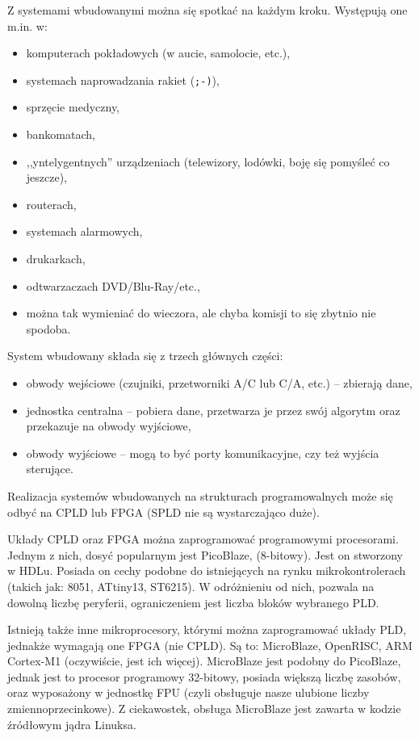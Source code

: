 Z systemami wbudowanymi można się spotkać na każdym kroku. Występują one m.in. w:
\begin{itemize}
\item komputerach pokładowych (w aucie, samolocie, etc.), 
\item systemach naprowadzania rakiet (\texttt{;-)}),
\item sprzęcie medyczny,
\item bankomatach,
\item ,,yntelygentnych'' urządzeniach (telewizory, lodówki, boję się pomyśleć co jeszcze),
\item routerach,
\item systemach alarmowych,
\item drukarkach,
\item odtwarzaczach DVD/Blu-Ray/etc.,
\item można tak wymieniać do wieczora, ale chyba komisji to się zbytnio nie spodoba.
\end{itemize} 

System wbudowany składa się z trzech głównych części:
\begin{itemize}
\item obwody wejściowe (czujniki, przetworniki A/C lub C/A, etc.) -- zbierają dane,
\item jednostka centralna -- pobiera dane, przetwarza je przez swój algorytm oraz przekazuje na obwody wyjściowe,
\item obwody wyjściowe -- mogą to być porty komunikacyjne, czy też wyjścia sterujące.
\end{itemize}

Realizacja systemów wbudowanych na strukturach programowalnych może się odbyć na CPLD lub FPGA (SPLD nie są wystarczająco duże).

Układy CPLD oraz FPGA można zaprogramować programowymi procesorami. Jednym z nich, dosyć popularnym jest PicoBlaze, (8-bitowy). Jest on stworzony w HDLu. Posiada on cechy podobne do istniejących na rynku mikrokontrolerach (takich jak: 8051, ATtiny13, ST6215). W odróżnieniu od nich, pozwala na dowolną liczbę peryferii, ograniczeniem jest liczba bloków wybranego PLD.

Istnieją także inne mikroprocesory, którymi można zaprogramować układy PLD, jednakże wymagają one FPGA (nie CPLD). Są to: MicroBlaze, OpenRISC, ARM Cortex-M1 (oczywiście, jest ich więcej). MicroBlaze jest podobny do PicoBlaze, jednak jest to procesor programowy 32-bitowy, posiada większą liczbę zasobów, oraz wyposażony w jednostkę FPU (czyli obsługuje nasze ulubione liczby zmiennoprzecinkowe). Z ciekawostek, obsługa MicroBlaze jest zawarta w kodzie źródłowym jądra Linuksa.

